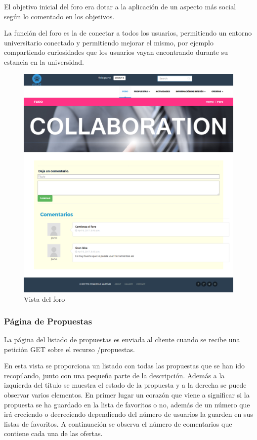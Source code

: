 El objetivo inicial del foro era dotar a la aplicación de un aspecto más social según lo comentado en los objetivos.


La función del foro es la de conectar a todos los usuarios, permitiendo un entorno universitario conectado y permitiendo mejorar el mismo, por ejemplo compartiendo curiosidades que los usuarios vayan encontrando durante su estancia en la universidad.

\begin{figure}[H]
   \centering
   \includegraphics[width=12cm]{img/foro}
   \caption{Vista del foro}
   \label{figura:foro}
\end{figure}


\subsubsection{Página de Propuestas}
\label{subsubsec:propuestas}


La página del listado de propuestas es enviada al cliente cuando se recibe una petición GET sobre el recurso /propuestas.


En esta vista se proporciona un listado con todas las propuestas que se han ido recopilando, junto con una pequeña parte de la descripción. Además a la izquierda del título se muestra el estado de la propuesta y a la derecha se puede observar varios elementos. En primer lugar un corazón que viene a significar si la propuesta se ha guardado en la lista de favoritos o no, además de un número que irá creciendo o decreciendo dependiendo del número de usuarios la guarden en sus listas de favoritos. A continuación se observa el número de comentarios que contiene cada una de las ofertas.


